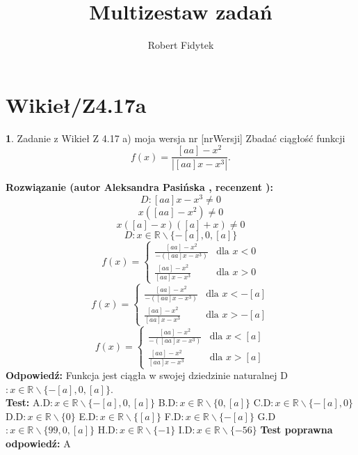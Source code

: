 \documentclass[12pt, a4paper]{article}
\title{Multizestaw zadań}
\author{Robert Fidytek}
\date{}
\theoremstyle{definition} %
\newtheorem{zad}{}
\newcommand{\kategoria}[1]{\section{#1}} %
\newcommand{\zadStart}[1]{\begin{zad}#1\newline} %
\newcommand{\zadStop}{\end{zad}}   %
\newcommand{\rozwStart}[2]{\noindent \textbf{Rozwiązanie (autor #1 , recenzent #2): }\newline} %
\newcommand{\rozwStop}{\newline}                                            %
\newcommand{\odpStart}{\noindent \textbf{Odpowiedź:}\newline}    %
\newcommand{\odpStop}{\newline}                                             %
\newcommand{\testStart}{\noindent \textbf{Test:}\newline} %
\newcommand{\testStop}{\newline} %
\newcommand{\kluczStart}{\noindent \textbf{Test poprawna odpowiedź:}\newline} %
\newcommand{\kluczStop}{\newline} %
\begin{document}
\maketitle


\kategoria{Wikieł/Z4.17a}
\zadStart{Zadanie z Wikieł Z 4.17 a) moja wersja nr [nrWersji]}
Zbadać ciągłość funkcji $$f(x)=\frac{[aa]-x^2}{|[aa]x-x^3|}.$$
\zadStop
\rozwStart{Aleksandra Pasińska}{}
$$D:[aa]x-x^3\neq 0$$
$$x([aa]-x^2)\neq0$$
$$x([a]-x)([a]+x)\neq0$$
$$D:x\in \mathbb{R}\backslash \{-[a],0,[a]\}$$
$$f(x)= \left\{ \begin{array}{ll}
\frac{[aa]-x^2}{-([aa]x-x^3)} & \textrm{dla $x<0$}\\
\frac{[aa]-x^2}{[aa]x-x^3} & \textrm{dla $x>0$} 
\end{array} \right.$$
$$f(x)= \left\{ \begin{array}{ll}
\frac{[aa]-x^2}{-([aa]x-x^3)} & \textrm{dla $x<-[a]$}\\
\frac{[aa]-x^2}{[aa]x-x^3} & \textrm{dla $x>-[a]$} 
\end{array} \right.$$
$$f(x)= \left\{ \begin{array}{ll}
\frac{[aa]-x^2}{-([aa]x-x^3)} & \textrm{dla $x<[a]$}\\
\frac{[aa]-x^2}{[aa]x-x^3} & \textrm{dla $x>[a]$} 
\end{array} \right.$$
\rozwStop
\odpStart
Funkcja jest ciągła w swojej dziedzinie naturalnej D$:x\in \mathbb{R}\backslash \{-[a],0,[a]\}$.\\
\odpStop
\testStart
A.D$:x\in \mathbb{R}\backslash \{-[a],0,[a]\}$
B.D$:x\in \mathbb{R}\backslash \{0,[a]\}$
C.D$:x\in \mathbb{R}\backslash \{-[a],0\}$
D.D$:x\in \mathbb{R}\backslash \{0\}$
E.D$:x\in \mathbb{R}\backslash \{[a]\}$
F.D$:x\in \mathbb{R}\backslash \{-[a]\}$
G.D$:x\in \mathbb{R}\backslash \{99,0,[a]\}$
H.D$:x\in \mathbb{R}\backslash \{-1\}$
I.D$:x\in \mathbb{R}\backslash \{-56\}$
\testStop
\kluczStart
A
\kluczStop
\end{document}
